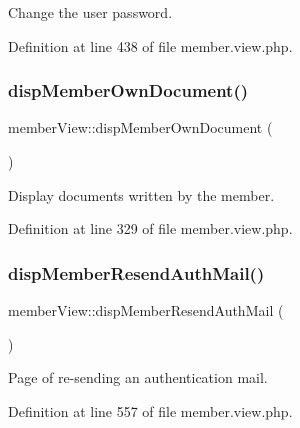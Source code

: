 Change the user password. 



Definition at line 438 of file member.\+view.\+php.

\hypertarget{classmemberView_a8c235800dc5fc7484694b852cf7119c6}{}\label{classmemberView_a8c235800dc5fc7484694b852cf7119c6} 
\subsubsection{\texorpdfstring{disp\+Member\+Own\+Document()}{dispMemberOwnDocument()}}
{\footnotesize\ttfamily member\+View\+::disp\+Member\+Own\+Document (\begin{DoxyParamCaption}{ }\end{DoxyParamCaption})}



Display documents written by the member. 



Definition at line 329 of file member.\+view.\+php.

\hypertarget{classmemberView_a6796539153aa0a8deda927e51ba302ed}{}\label{classmemberView_a6796539153aa0a8deda927e51ba302ed} 
\subsubsection{\texorpdfstring{disp\+Member\+Resend\+Auth\+Mail()}{dispMemberResendAuthMail()}}
{\footnotesize\ttfamily member\+View\+::disp\+Member\+Resend\+Auth\+Mail (\begin{DoxyParamCaption}{ }\end{DoxyParamCaption})}



Page of re-\/sending an authentication mail. 



Definition at line 557 of file member.\+view.\+php.

\hypertarget{classmemberView_a2438b4d67ac1620d9cc5c74e81f09c68}{}\label{classmemberView_a2438b4d67ac1620d9cc5c74e81f09c68} 
